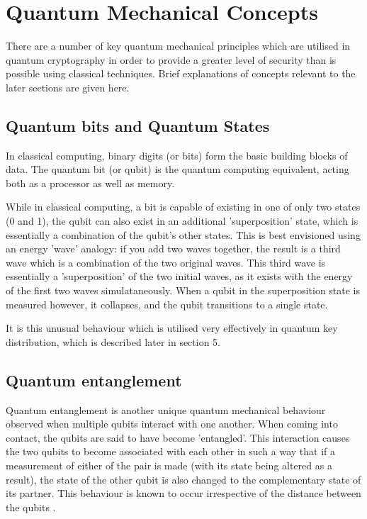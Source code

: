 \documentclass[runningheads,a4paper]{llncs}
\begin{document}
\section{Quantum Mechanical Concepts}

There are a number of key quantum mechanical principles which are utilised in quantum cryptography in order to provide a greater level of security than is possible using classical techniques. Brief explanations of concepts relevant to the later sections are given here.

\subsection{Quantum bits and Quantum States}

In classical computing, binary digits (or bits) form the basic building blocks of data. The quantum bit (or qubit) is the quantum computing equivalent, acting both as a processor as well as memory. 

While in classical computing, a bit is capable of existing in one of only two states (0 and 1), the qubit can also exist in an additional 'superposition' state, which is essentially a combination of the qubit's other states. This is best envisioned using an energy 'wave' analogy: if you add two waves together, the result is a third wave which is a combination of the two original waves. This third wave is essentially a 'superposition' of the two initial waves, as it exists with the energy of the first two waves simulataneously. When a qubit in the superposition state is measured however, it collapses, and the qubit transitions to a single state. 

It is this unusual behaviour which is utilised very effectively in quantum key distribution, which is described later in section 5.

\subsection{Quantum entanglement}

Quantum entanglement is another unique quantum mechanical behaviour observed when multiple qubits interact with one another. When coming into contact, the qubits are said to have become 'entangled'. This interaction causes the two qubits to become associated with each other in such a way that if a measurement of either of the pair is made (with its state being altered as a result), the state of the other qubit is also changed to the complementary state of its partner. This behaviour is known to occur irrespective of the distance between the qubits \cite{Tegmark:2001qh}.
\end{document}
